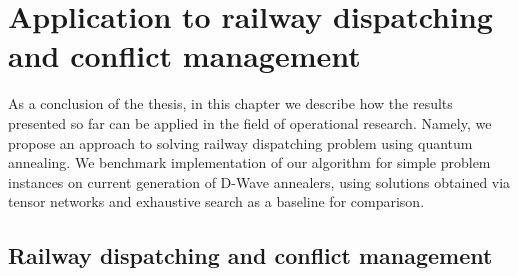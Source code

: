 \chapter{Application to railway dispatching and conflict management}

As a conclusion of the thesis, in this chapter we describe how the results presented so far can be applied in the field of operational research. Namely, we propose an approach to solving railway dispatching problem using quantum annealing. We benchmark implementation of our algorithm for simple problem instances on current generation of D-Wave annealers, using solutions obtained via tensor networks and exhaustive search as a baseline for comparison.


\section{Railway dispatching and conflict management}
